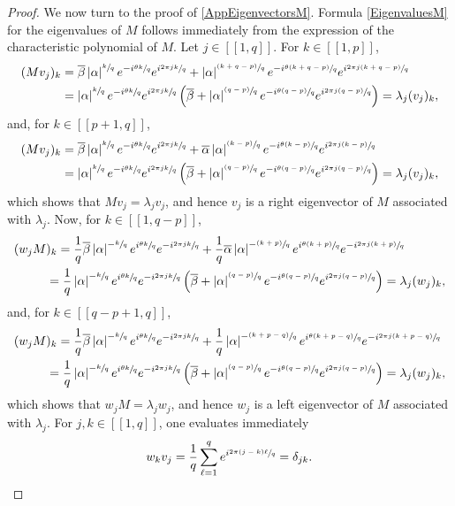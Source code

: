 \documentclass[10pt]{article}
\newcommand{\psfrac}[2]{\sfrac{(#1)}{#2}}
\newcommand{\llbracket}{[\![}
\newcommand{\rrbracket}{]\!]}
\theoremstyle{plain}
\theoremstyle{definition}
\newcommand{\abs}[1]{\left\lvert #1\right \rvert}
\numberwithin{equation}{section}\numberwithin{figure}{section}\emergencystretch=3em
\begin{document}
\begin{proof}
We now turn to the proof of \eqref{AppEigenvectorsM}. Formula \eqref{EigenvaluesM} for the eigenvalues of $M$ follows immediately from the expression of the characteristic polynomial of $M$. Let $j \in \llbracket 1, q\rrbracket$. For $k \in \llbracket 1, p\rrbracket$,
\begin{align*}
(M v_j)_k & = \overline\beta \abs{\alpha}^{\sfrac{k}{q}} e^{-i \sfrac{\theta k}{q}} e^{i \sfrac{2\pi j k}{q}} + \abs{\alpha}^{\psfrac{k+q-p}{q}} e^{-i \sfrac{\theta (k+q-p)}{q}} e^{i \sfrac{2\pi j (k+q-p)}{q}} \\
& = \abs{\alpha}^{\sfrac{k}{q}} e^{-i \sfrac{\theta k}{q}} e^{i \sfrac{2\pi j k}{q}} \left(\overline\beta + \abs{\alpha}^{\psfrac{q-p}{q}} e^{-i \sfrac{\theta (q-p)}{q}} e^{i \sfrac{2\pi j (q-p)}{q}}\right) = \lambda_j (v_j)_k,
\end{align*}
and, for $k \in \llbracket p+1, q\rrbracket$,
\begin{align*}
(M v_j)_k & = \overline\beta \abs{\alpha}^{\sfrac{k}{q}} e^{-i \sfrac{\theta k}{q}} e^{i \sfrac{2\pi j k}{q}} + \overline\alpha \abs{\alpha}^{\psfrac{k-p}{q}} e^{-i \sfrac{\theta (k-p)}{q}} e^{i \sfrac{2\pi j (k-p)}{q}} \\
& = \abs{\alpha}^{\sfrac{k}{q}} e^{-i \sfrac{\theta k}{q}} e^{i \sfrac{2\pi j k}{q}} \left(\overline\beta + \abs{\alpha}^{\psfrac{q-p}{q}} e^{-i \sfrac{\theta (q-p)}{q}} e^{i \sfrac{2\pi j (q-p)}{q}}\right) = \lambda_j (v_j)_k,
\end{align*}
which shows that $M v_j = \lambda_j v_j$, and hence $v_j$ is a right eigenvector of $M$ associated with $\lambda_j$. Now, for $k \in \llbracket 1, q-p\rrbracket$,
\begin{align*}
(w_j M&)_k = \frac{1}{q} \overline\beta \abs{\alpha}^{-\sfrac{k}{q}} e^{i \sfrac{\theta k}{q}} e^{-i \sfrac{2\pi j k}{q}} + \frac{1}{q} \overline\alpha \abs{\alpha}^{-\psfrac{k+p}{q}} e^{i \sfrac{\theta (k+p)}{q}} e^{-i \sfrac{2\pi j (k+p)}{q}} \\
& = \frac{1}{q} \abs{\alpha}^{-\sfrac{k}{q}} e^{i \sfrac{\theta k}{q}} e^{-i \sfrac{2\pi j k}{q}} \left(\overline\beta + \abs{\alpha}^{\psfrac{q-p}{q}} e^{-i \sfrac{\theta (q-p)}{q}} e^{i \sfrac{2\pi j (q-p)}{q}}\right) = \lambda_j (w_j)_k,
\end{align*}
and, for $k \in \llbracket q-p+1, q\rrbracket$,
\begin{align*}
(w_j M&)_k = \frac{1}{q} \overline\beta \abs{\alpha}^{-\sfrac{k}{q}} e^{i \sfrac{\theta k}{q}} e^{-i \sfrac{2\pi j k}{q}} + \frac{1}{q} \abs{\alpha}^{-\psfrac{k+p-q}{q}} e^{i \sfrac{\theta (k+p-q)}{q}} e^{-i \sfrac{2\pi j (k+p-q)}{q}} \\
& = \frac{1}{q} \abs{\alpha}^{-\sfrac{k}{q}} e^{i \sfrac{\theta k}{q}} e^{-i \sfrac{2\pi j k}{q}} \left(\overline\beta + \abs{\alpha}^{\psfrac{q-p}{q}} e^{-i \sfrac{\theta (q-p)}{q}} e^{i \sfrac{2\pi j (q-p)}{q}}\right) = \lambda_j (w_j)_k,
\end{align*}
which shows that $w_j M = \lambda_j w_j$, and hence $w_j$ is a left eigenvector of $M$ associated with $\lambda_j$. For $j, k \in \llbracket 1, q\rrbracket$, one evaluates immediately
\[
w_k v_j = \frac{1}{q} \sum_{\ell=1}^q e^{i \sfrac{2\pi (j - k) \ell}{q}} = \delta_{jk}.
\]


\end{proof}
\end{document}
